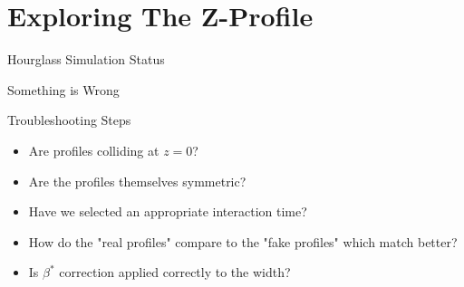 \section{Exploring The Z-Profile}
\label{ch:ExploringZProfile}

\begin{frame}{Hourglass Simulation Status}

\end{frame}

\begin{frame}{Something is Wrong}

\end{frame}

\begin{frame}{Troubleshooting Steps}

\begin{itemize}
\item Are profiles colliding at $z = 0$?
\item Are the profiles themselves symmetric?
\item Have we selected an appropriate interaction time?
\item How do the "real profiles" compare to the "fake profiles" which match better?
\item Is $\beta^{*}$ correction applied correctly to the width?
\end{itemize}

\end{frame}
